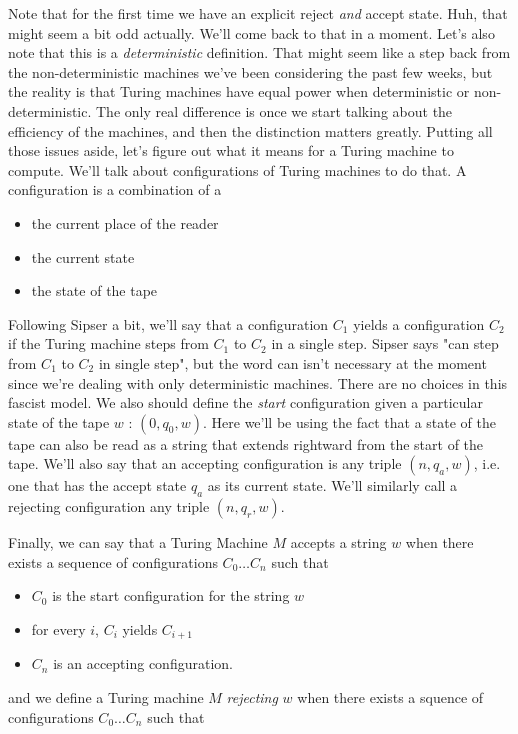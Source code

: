 \documentclass[11pt]{article}
\begin{document}
Note that for the first time we have an explicit reject \emph{and} accept state. Huh, that might seem a bit odd actually. We'll come back to that in a moment. Let's also note that this is a \emph{deterministic} definition. That might seem like a step back from the non-deterministic machines we've been considering the past few weeks, but the reality is that Turing machines have equal power when deterministic or non-deterministic. The only real difference is once we start talking about the efficiency of the machines, and then the distinction matters greatly. Putting all those issues aside, let's figure out what it means for a Turing machine to compute. We'll talk about configurations of Turing machines to do that. A configuration is a combination of a 
\begin{itemize}
\item the current place of the reader
\item the current state
\item the state of the tape
\end{itemize}
Following Sipser a bit, we'll say that a configuration $C_1$ yields a configuration $C_2$ if the Turing machine steps from $C_1$ to $C_2$ in a single step. Sipser says "can step from $C_1$ to $C_2$ in single step", but the word can isn't necessary at the moment since we're dealing with only deterministic machines. There are no choices in this fascist model. We also should define the \emph{start} configuration given a particular state of the tape $w$ : $(0 , q_0 , w)$. Here we'll be using the fact that a state of the tape can also be read as a string that extends rightward from the start of the tape. We'll also say that an accepting configuration is any triple $(n, q_a, w)$, i.e. one that has the accept state $q_a$ as its current state. We'll similarly call a rejecting configuration any triple $(n, q_r, w)$.

Finally, we can say that a Turing Machine $M$ accepts a string $w$ when there exists a sequence of configurations $C_0 \ldots C_n$ such that

\begin{itemize}
\item $C_0$ is the start configuration for the string $w$
\item for every $i$, $C_i$ yields $C_{i+1}$
\item $C_n$ is an accepting configuration.
\end{itemize}

and we define a Turing machine $M$ \emph{rejecting} $w$ when there exists a squence of configurations $C_0 \ldots C_n$ such that
\end{document}
